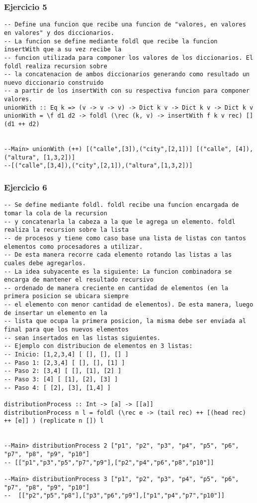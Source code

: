 \subsubsection*{Ejercicio 5}
\begin{lstlisting}
-- Define una funcion que recibe una funcion de "valores, en valores en valores" y dos diccionarios.
-- La funcion se define mediante foldl que recibe la funcion insertWith que a su vez recibe la
-- funcion utilizada para componer los valores de los diccionarios. El foldl realiza recursion sobre
-- la concatenacion de ambos diccionarios generando como resultado un nuevo diccionario construido
-- a partir de los insertWith con su respectiva funcion para componer valores.
unionWith :: Eq k => (v -> v -> v) -> Dict k v -> Dict k v -> Dict k v
unionWith = \f d1 d2 -> foldl (\rec (k, v) -> insertWith f k v rec) [] (d1 ++ d2) 


--Main> unionWith (++) [("calle",[3]),("city",[2,1])] [("calle", [4]), ("altura", [1,3,2])]
--[("calle",[3,4]),("city",[2,1]),("altura",[1,3,2])]
\end{lstlisting}
\vspace{1cm}

\subsubsection*{Ejercicio 6}
\begin{lstlisting}
-- Se define mediante foldl. foldl recibe una funcion encargada de tomar la cola de la recursion
-- y concatenarla la cabeza a la que le agrega un elemento. foldl realiza la recursion sobre la lista
-- de procesos y tiene como caso base una lista de listas con tantos elementos como procesadores a utilizar.
-- De esta manera recorre cada elemento rotando las listas a las cuales debe agregarlos.
-- La idea subyacente es la siguiente: La funcion combinadora se encarga de mantener el resultado recursivo
-- ordenado de manera creciente en cantidad de elementos (en la primera posicion se ubicara siempre
-- el elemento con menor cantidad de elementos). De esta manera, luego de insertar un elemento en la
-- lista que ocupa la primera posicion, la misma debe ser enviada al final para que los nuevos elementos
-- sean insertados en las listas siguientes.
-- Ejemplo con distribucion de elementos en 3 listas:
-- Inicio: [1,2,3,4] [ [], [], [] ]
-- Paso 1: [2,3,4] [ [], [], [1] ]
-- Paso 2: [3,4] [ [], [1], [2] ]
-- Paso 3: [4] [ [1], [2], [3] ]
-- Paso 4: [ [2], [3], [1,4] ]

distributionProcess :: Int -> [a] -> [[a]]
distributionProcess n l = foldl (\rec e -> (tail rec) ++ [(head rec) ++ [e]] ) (replicate n []) l


--Main> distributionProcess 2 ["p1", "p2", "p3", "p4", "p5", "p6", "p7", "p8", "p9", "p10"]
-- [["p1","p3","p5","p7","p9"],["p2","p4","p6","p8","p10"]]

--Main> distributionProcess 3 ["p1", "p2", "p3", "p4", "p5", "p6", "p7", "p8", "p9", "p10"]
--  [["p2","p5","p8"],["p3","p6","p9"],["p1","p4","p7","p10"]]
\end{lstlisting}
\vspace{1cm}

